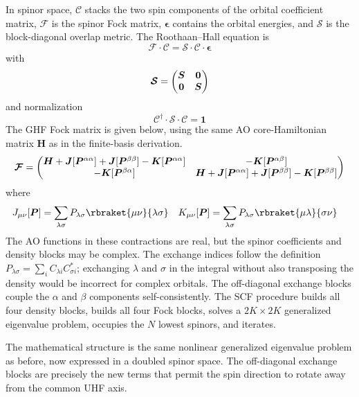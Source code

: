\documentclass[11pt,a4paper,titlepage]{article}
\numberwithin{equation}{section}
\newcommand{\bH}{\boldsymbol{H}}
\newcommand{\bI}{\boldsymbol{1}}
\newcommand{\bJ}{\boldsymbol{J}}
\newcommand{\bK}{\boldsymbol{K}}
\newcommand{\bO}{\boldsymbol{0}}
\newcommand{\bP}{\boldsymbol{P}}
\newcommand{\bS}{\boldsymbol{S}}
\newcommand{\beps}{\boldsymbol{\epsilon}}
\begin{document}
In spinor space, $\boldsymbol{\mathcal C}$ stacks the two spin components
of the orbital coefficient matrix, $\boldsymbol{\mathcal F}$ is the
spinor Fock matrix, $\beps$ contains the orbital energies,
and $\boldsymbol{\mathcal S}$ is the block-diagonal overlap metric.
The Roothaan--Hall equation is
\begin{equation}
    \boldsymbol{\mathcal F}\cdot\boldsymbol{\mathcal C}
    =\boldsymbol{\mathcal S}\cdot\boldsymbol{\mathcal C}
     \cdot\beps
\end{equation}
with
\begin{equation}
  \boldsymbol{\mathcal S}=\mqty(\bS&\bO\\\bO&\bS)
\end{equation}
and normalization
\begin{equation}
  \boldsymbol{\mathcal C}^\dagger\cdot\boldsymbol{\mathcal S}
  \cdot\boldsymbol{\mathcal C}=\bI
\end{equation}
The GHF Fock matrix is given below, using the same AO core-Hamiltonian
matrix $\bH$ as in the finite-basis derivation.
\begin{equation}
\boldsymbol{\mathcal F}=\mqty(
  \bH+\bJ[\bP^{\alpha\alpha}]+\bJ[\bP^{\beta\beta}]
    -\bK[\bP^{\alpha\alpha}]
  &-\bK[\bP^{\alpha\beta}]\\
  -\bK[\bP^{\beta\alpha}]
  &\bH+\bJ[\bP^{\alpha\alpha}]+\bJ[\bP^{\beta\beta}]
    -\bK[\bP^{\beta\beta}])
\end{equation}
where
\begin{align}
  J_{\mu\nu}[\bP]
  &=\sum_{\lambda\sigma}P_{\lambda\sigma}
    \rbraket{\mu\nu}{\lambda\sigma}
  &
  K_{\mu\nu}[\bP]
  &=\sum_{\lambda\sigma}P_{\lambda\sigma}
    \rbraket{\mu\lambda}{\sigma\nu}
\end{align}
The AO functions in these contractions are real, but the spinor coefficients
and density blocks may be complex. The exchange indices follow the definition
$P_{\lambda\sigma}=\sum_i C_{\lambda i}C_{\sigma i}^*$; exchanging
$\lambda$ and $\sigma$ in the integral without also transposing the density
would be incorrect for complex orbitals.
The off-diagonal exchange blocks couple the $\alpha$ and $\beta$ components
self-consistently. The SCF procedure builds all four density blocks, builds
all four Fock blocks, solves a $2K\times2K$ generalized eigenvalue problem,
occupies the $N$ lowest spinors, and iterates.

The mathematical structure is the same nonlinear generalized eigenvalue
problem as before, now expressed in a doubled spinor space. The off-diagonal
exchange blocks are precisely the new terms that permit the spin direction to
rotate away from the common UHF axis.
\end{document}
